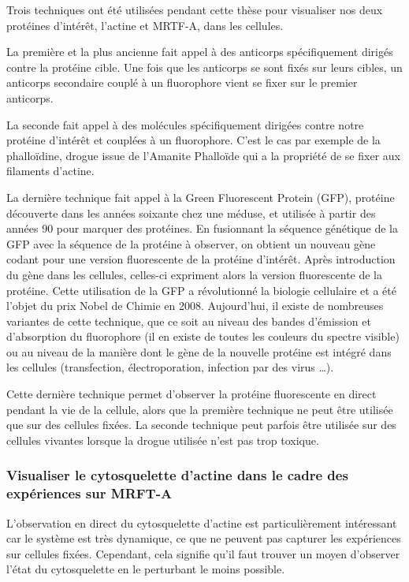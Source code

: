 	Trois techniques ont été utilisées pendant cette thèse pour visualiser nos deux protéines d'intérêt, l'actine et MRTF-A, dans les cellules. 
	
	La première et la plus ancienne fait appel à des anticorps spécifiquement dirigés contre la protéine cible. Une fois que les anticorps se sont fixés sur leurs cibles, un anticorps secondaire couplé à un fluorophore vient se fixer sur le premier anticorps. 
	
	La seconde fait appel à des molécules spécifiquement dirigées contre notre protéine d'intérêt et couplées à un fluorophore. C'est le cas par exemple de la phalloïdine, drogue issue de l'Amanite Phalloïde qui a la propriété de se fixer aux filaments d'actine.	
	
	La dernière technique fait appel à la Green Fluorescent Protein (GFP), protéine découverte dans les années soixante chez une méduse, et utilisée à partir des années 90 pour marquer des protéines. En fusionnant la séquence génétique de la GFP avec la séquence de la protéine à observer, on obtient un nouveau gène codant pour une version fluorescente de la protéine d'intérêt. Après introduction du gène dans les cellules, celles-ci expriment alors la version fluorescente de la protéine. Cette utilisation de la GFP a révolutionné la biologie cellulaire et a été l'objet du prix Nobel de Chimie en 2008. Aujourd'hui, il existe de nombreuses variantes de cette technique, que ce soit au niveau des bandes d'émission et d'absorption du fluorophore (il en existe de toutes les couleurs du spectre visible) ou au niveau de la manière dont le gène de la nouvelle protéine est intégré dans les cellules (transfection, électroporation, infection par des virus  \dots).
	
	Cette dernière technique permet d'observer la protéine fluorescente en direct pendant la vie de la cellule, alors que la première technique ne peut être utilisée que sur des cellules fixées. La seconde technique peut parfois être utilisée sur des cellules vivantes lorsque la drogue utilisée n'est pas trop toxique. 
	
	\subsubsection{Visualiser le cytosquelette d'actine dans le cadre des expériences sur MRFT-A}
	
L'observation en direct du cytosquelette d'actine est particulièrement intéressant car le système est très dynamique, ce que ne peuvent pas capturer les expériences sur cellules fixées.
Cependant, cela signifie qu'il faut trouver un moyen d'observer l'état du cytosquelette en le perturbant le moins possible. 


